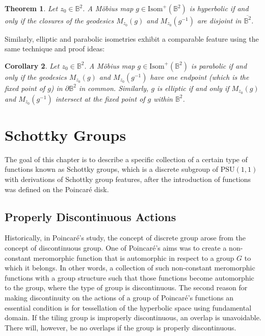 \documentclass[12pt,oneside]{sfsuthesis}
\theoremstyle{plain} %
\newtheorem{theorem}{Theorem}[chapter]
\newtheorem{corollary}[theorem]{Corollary}
\theoremstyle{definition}  %
\theoremstyle{remark}  %
\theoremstyle{plain}
\begin{document}
{\begin{theorem}\label{hyperbolic lines}
Let $z_0\in\mathbb{B}^2$. A M\"{o}bius map $g\in\text{Isom}^+(\mathbb{B}^2)$ is hyperbolic if and only if the closures of the geodesics $M_{z_0}(g)$ and $M_{z_0}(g^{-1})$ are disjoint in $\overline{\mathbb{B}^2}$.
\end{theorem}



Similarly, elliptic and parabolic isometries exhibit a comparable feature using the same technique and proof ideas:
\begin{corollary}\label{parabolic and elliptic lines}
Let $z_0\in\mathbb{B}^2$. A M\"{o}bius map $g\in\text{Isom}^+(\mathbb{B}^2)$ is parabolic if and only if the geodesics $M_{z_0}(g)$ and $M_{z_0}(g^{-1})$ have one endpoint (which is the fixed point of $g$) in $\partial\mathbb{B}^2$ in common. Similarly, $g$ is elliptic if and only if $M_{z_0}(g)$ and $M_{z_0}(g^{-1})$ intersect at the fixed point of $g$ within $\mathbb{B}^2$.
\end{corollary}

\chapter{Schottky Groups}\label{discrete groups}

The goal of this chapter is to describe a specific collection of a certain type of functions known as Schottky groups, which is a discrete subgroup of $\text{PSU}(1,1)$ with derivations of Schottky group features, after the introduction of functions was defined on the Poincar\'{e} disk.


\section{Properly Discontinuous Actions}\label{Properly Discontinuous Actions}

Historically, in Poincar\'{e}’s study, the concept of discrete group arose from the concept of discontinuous group. One of Poincar\'{e}’s aims was to create a non-constant meromorphic function that is automorphic in respect to a group $G$ to which it belongs. In other words, a collection of such non-constant meromorphic functions with a group structure such that those functions become automorphic to the group, where the type of group is discontinuous. The second reason for making discontinuity on the actions of a group of Poincar\'{e}'s functions an essential condition is for tessellation of the hyperbolic space using fundamental domain\cite{poincare1882theorie}. If the tiling group is improperly discontinuous, an overlap is unavoidable. There will, however, be no overlaps if the group is properly discontinuous.

}
\end{document}
